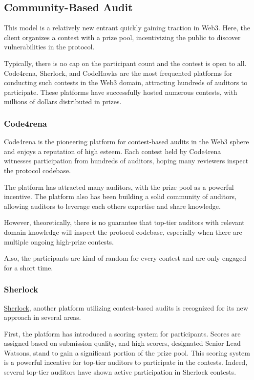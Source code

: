 \documentclass[10pt]{extarticle}
\begin{document}
\subsection{ Community-Based Audit}\label{33-community-based-audit}

This model is a relatively new entrant quickly gaining traction in Web3.
Here, the client organizes a contest with a prize pool, incentivizing
the public to discover vulnerabilities in the protocol.

Typically, there is no cap on the participant count and the contest is
open to all. Code4rena, Sherlock, and CodeHawks are the most frequented
platforms for conducting such contests in the Web3 domain, attracting
hundreds of auditors to participate. These platforms have successfully
hosted numerous contests, with millions of dollars distributed in
prizes.

\subsubsection{ Code4rena}\label{331-code4rena}

\href{https://code4rena.com/}{Code4rena} is the pioneering platform for
contest-based audits in the Web3 sphere and enjoys a reputation of high
esteem. Each contest held by Code4rena witnesses participation from
hundreds of auditors, hoping many reviewers inspect the protocol
codebase.

The platform has attracted many auditors, with the prize pool as a
powerful incentive. The platform also has been building a solid
community of auditors, allowing auditors to leverage each
other\textquotesingle s expertise and share knowledge.

However, theoretically, there is no guarantee that top-tier auditors
with relevant domain knowledge will inspect the protocol codebase,
especially when there are multiple ongoing high-prize contests.

Also, the participants are kind of random for every contest and are only
engaged for a short time.

\subsubsection{ Sherlock}\label{332-sherlock}

\href{https://sherlock.xyz/}{Sherlock}, another platform utilizing
contest-based audits is recognized for its new approach in several
areas.

First, the platform has introduced a scoring system for participants.
Scores are assigned based on submission quality, and high scorers,
designated Senior Lead Watsons, stand to gain a significant portion of
the prize pool. This scoring system is a powerful incentive for top-tier
auditors to participate in the contests. Indeed, several top-tier
auditors have shown active participation in Sherlock contests.
\end{document}
